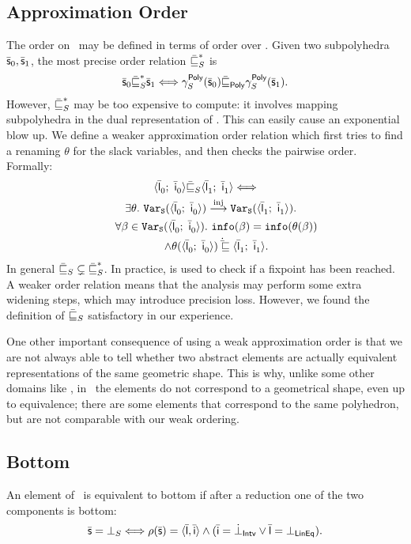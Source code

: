 \documentclass[sttt]{svjour}
\begin{document}
\subsection{Approximation Order}
The order on \Subpoly\ may be defined in terms of order over \Polyhedra.
Given two subpolyhedra $\bar{\mathsf{\mathsf{s}}}_0, \bar{\mathsf{\mathsf{s}}}_1$, the most precise order relation $\bar{\sqsubseteq}_{S}^{*}$ is 
\[
\bar{\mathsf{\mathsf{s}}}_{0} \bar{\sqsubseteq}_{S}^{*} \bar{\mathsf{\mathsf{s}}}_{1} \Longleftrightarrow  \gamma^{\mathsf{Poly}}_{S}(\bar{\mathsf{\mathsf{s}}}_{0})  \bar{\sqsubseteq}_{\mathsf{Poly}} \gamma^{\mathsf{Poly}}_{S}(\bar{\mathsf{\mathsf{s}}}_{1}).
\]
However,  $\bar{\sqsubseteq}_{S}^{*}$ may be too expensive to compute: it involves mapping subpolyhedra in the dual representation of \Polyhedra.
 This can easily cause an exponential blow up.
We define a weaker approximation order relation which first tries to find a renaming $\theta$ for the slack variables, and then checks  the pairwise order.
Formally:  
\begin{multline*}
\langle \bar{\mathsf{\mathsf{l}}}_{0}^{};\ \bar{\mathsf{\mathsf{i}}}_{0}^{} \rangle \bar{\sqsubseteq}_{S} \langle \bar{\mathsf{\mathsf{l}}}_{1}^{};\ \bar{\mathsf{\mathsf{i}}}_{1}^{} \rangle \Longleftrightarrow \\
\quad \exists \theta.~ \mathtt{Var}_\mathtt{S}(\langle \bar{\mathsf{\mathsf{l}}}_{0}^{};\ \bar{\mathsf{\mathsf{i}}}_{0}^{} \rangle) \stackrel{\mathrm{inj}}{\longrightarrow}  \mathtt{Var}_\mathtt{S}(\langle \bar{\mathsf{\mathsf{l}}}_{1}^{};\ \bar{\mathsf{\mathsf{i}}}_{1}^{} \rangle). \\
\qquad \forall \beta_{}  \in \mathtt{Var}_\mathtt{S}(\langle \bar{\mathsf{\mathsf{l}}}_{0}^{};\ \bar{\mathsf{\mathsf{i}}}_{0}^{} \rangle).\  \mathtt{info}(\beta_{}) =  \mathtt{info}(\theta(\beta_{})) \\
\qquad \wedge \theta(\langle \bar{\mathsf{\mathsf{l}}}_{0}^{};\ \bar{\mathsf{\mathsf{i}}}_{0}^{} \rangle) \dot{\bar{\sqsubseteq}} \langle \bar{\mathsf{\mathsf{l}}}_{1}^{};\ \bar{\mathsf{\mathsf{i}}}_{1}^{} \rangle.
\end{multline*}
In general $\bar{\sqsubseteq}_{S} \subsetneq \bar{\sqsubseteq}_{S}^{*}$.
In practice, \lessS{} is used to check if a fixpoint has been reached. 
A weaker order relation means that the analysis may perform some extra widening steps, which may introduce  precision loss.
However, we found the definition of $\bar{\sqsubseteq}_{S}$ satisfactory in our experience.

One other important consequence of using a weak approximation order is that we are not always able to tell whether two abstract elements
are actually equivalent representations of the same geometric shape.
This is why, unlike some other domains like \Polyhedra{}, in \Subpoly\ the elements do not correspond to a geometrical shape, even up to equivalence; there are some elements that correspond to the same polyhedron, but are not comparable with our weak ordering.

\subsection{Bottom}
An element of \Subpoly\ is equivalent to  bottom if after a reduction one of the two components is bottom:
\[
\bar{\mathsf{\mathsf{s}}} = \bot_{S} \Longleftrightarrow \rho(\bar{\mathsf{\mathsf{s}}}) = \langle \bar{\mathsf{\mathsf{l}}}, \bar{\mathsf{\mathsf{i}}} \rangle \wedge (\bar{\mathsf{\mathsf{i}}} = \dot\bot_{\mathsf{Intv}} \vee \bar{\mathsf{\mathsf{l}}} = \bot_{\mathsf{LinEq}}).
\]
 
\end{document}
